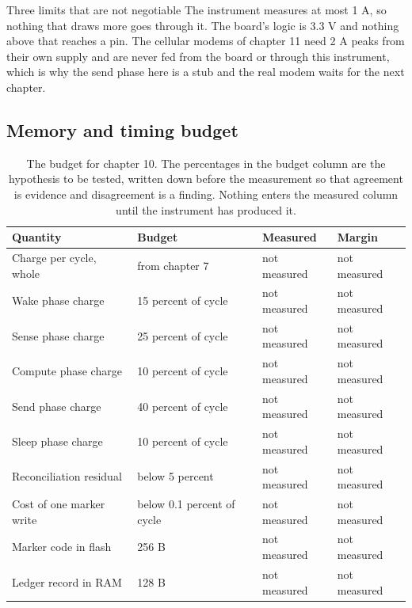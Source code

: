 \begin{note}{Three limits that are not negotiable}
The instrument measures at most 1 A, so nothing that draws more goes through it.
The board's logic is 3.3 V and nothing above that reaches a pin. The cellular
modems of chapter 11 need 2 A peaks from their own supply and are never fed from
the board or through this instrument, which is why the send phase here is a stub
and the real modem waits for the next chapter.
\end{note}

\subsection*{Memory and timing budget}


\begin{table}[H]\centering\small
\begin{tabular}{p{44mm}p{28mm}p{28mm}p{30mm}}
\toprule
Quantity & Budget & Measured & Margin \\
\midrule
Charge per cycle, whole & from chapter 7 & not measured & not measured \\
Wake phase charge & 15 percent of cycle & not measured & not measured \\
Sense phase charge & 25 percent of cycle & not measured & not measured \\
Compute phase charge & 10 percent of cycle & not measured & not measured \\
Send phase charge & 40 percent of cycle & not measured & not measured \\
Sleep phase charge & 10 percent of cycle & not measured & not measured \\
Reconciliation residual & below 5 percent & not measured & not measured \\
Cost of one marker write & below 0.1 percent of cycle & not measured & not measured \\
Marker code in flash & 256 B & not measured & not measured \\
Ledger record in RAM & 128 B & not measured & not measured \\
\bottomrule
\end{tabular}
\caption{The budget for chapter 10. The percentages in the budget column are the hypothesis to be tested, written down before the measurement so that agreement is evidence and disagreement is a finding. Nothing enters the measured column until the instrument has produced it.}
\end{table}

